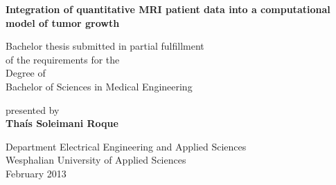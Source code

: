 
\begin{titlepage}
       \begin{center}
           {\Huge \textbf{
             Integration of quantitative MRI patient data into a computational model of tumor growth}\par}
           \vspace{4cm}
           {\Large Bachelor thesis submitted in partial fulfillment \\
           of the requirements for the\\
           Degree of\\
           Bachelor of Sciences in Medical Engineering\\
}
\vspace{2cm}

\large{presented by}\\

\Large{\textbf{Tha\'{i}s Soleimani Roque}}


\vfill

{\normalsize Department Electrical Engineering and Applied Sciences
           \\Wesphalian University of Applied Sciences\\[2ex]February 2013}


       \end{center}
   \end{titlepage}

\newpage
{}
\thispagestyle{empty}
\hspace{1cm}

\newpage
\normalsize

